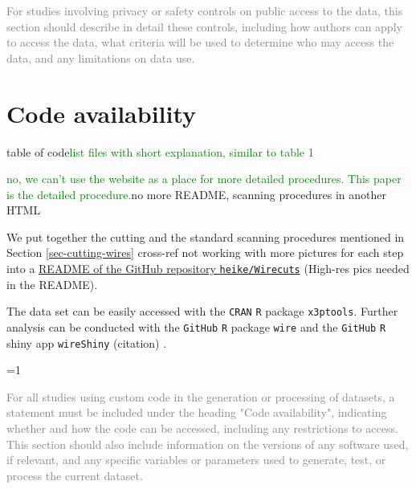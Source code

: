 \documentclass[fleqn,10pt]{wlscirep}
\newcommand{\tom}[1]{{\textcolor{RedOrange}{#1}}}
\newcommand{\hh}[1]{{\textcolor{Green}{#1}}}
\newcommand{\ifinstruction}{0} %
\begin{document}
\textcolor{gray}{For studies involving privacy or safety controls on public access to the data, this section should describe in detail these controls, including how authors can apply to access the data, what criteria will be used to determine who may access the data, and any limitations on data use.}
\fi

\section*{Code availability}\label{sec-code-availability}

\tom{table of code}\hh{list files with short explanation, similar to table 1}

\hh{no, we can't use the website as a place for more detailed procedures. This paper is the detailed procedure.}\tom{no more README, scanning procedures in another HTML}

We put together the cutting and the standard scanning procedures
mentioned in Section \ref{sec-cutting-wires} \tom{cross-ref not working}
with more pictures for each step into a
\href{https://github.com/heike/Wirecuts/blob/main/README.md}{README of the GitHub repository \texttt{heike/Wirecuts}}
\tom{(High-res pics needed in the README)}.

The data set can be easily accessed with the \texttt{CRAN} \texttt{R}
package \texttt{x3ptools}. Further analysis can be conducted with the
\texttt{GitHub} \texttt{R} package \texttt{wire} and the \texttt{GitHub}
\texttt{R} shiny app \texttt{wireShiny} \tom{(citation)} .

\ifnum \ifinstruction=1

\textcolor{gray}{For all studies using custom code in the generation or processing of datasets, a statement must be included under the heading "Code availability", indicating whether and how the code can be accessed, including any restrictions to access. This section should also include information on the versions of any software used, if relevant, and any specific variables or parameters used to generate, test, or process the current dataset.}
\fi



\end{document}
